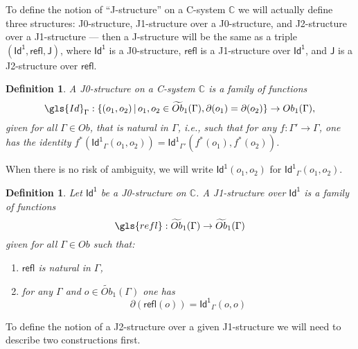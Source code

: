 \documentclass[12pt]{article}
\numberwithin{equation}{section}
\newenvironment{eq}{\begin{equation}}{\end{equation}}
\newtheorem{definition}[proposition]{Definition}
\newcommand{\llabel}[1]{\label{#1}}
\newcommand{\sr}{\rightarrow}
\newcommand{\wt}{\widetilde}
\newcommand{\aCC}{{\mathbb C}}  %
\newcommand{\Id}{\mathsf{Id^1}} %
\newcommand{\refl}{\mathsf{refl}}
\newcommand{\J}{\mathsf{J}}
\begin{document}
To define the notion of ``J-structure'' on a C-system $\aCC$ we will actually define three
structures: J0-structure, J1-structure over a J0-structure, and J2-structure
over a J1-structure --- then a J-structure will be the same as a triple
$(\Id,\refl,\J)$, where $\Id$ is a J0-structure, $\refl$ is a J1-structure over
$\Id$, and $\J$ is a J2-structure over $\refl$.

\begin{definition}
\llabel{2015.03.27.def1}
A J0-structure on a C-system $\aCC$ is a family of functions 
%
$$\gls{Id}_{\Gamma}:\{(o_1,o_2)\,|\,o_1, o_2 \in \wt{Ob}_1(\Gamma), \partial(o_1)=\partial(o_2)\}\sr Ob_1(\Gamma),$$
%
given for all $\Gamma\in Ob$, that is natural in $\Gamma$, i.e., such that for any
$f:\Gamma'\sr \Gamma$, one has the identity
$f^*(\Id_{\Gamma}(o_1,o_2))=\Id_{\Gamma'}(f^*(o_1),f^*(o_2))$.
\end{definition}

When there is no risk of ambiguity, we will write $\Id(o_1,o_2)$ for $\Id_{\Gamma}(o_1,o_2)$.

\begin{definition}
\llabel{2015.03.27.def2}
Let $\Id$ be a J0-structure on $\aCC$. A J1-structure over $\Id$ is a family of
functions
%
$$\gls{refl}:\wt{Ob}_1(\Gamma)\sr \wt{Ob}_1(\Gamma)$$
%
given for all $\Gamma\in Ob$ such that:
%
\begin{enumerate}
\item $\refl$ is natural in $\Gamma$,
\item for any $\Gamma$ and $o\in \wt{Ob}_1(\Gamma)$ one has 
%
\begin{eq}
\llabel{2015.03.27.eq8}
\partial(\refl(o))=\Id_\Gamma(o,o)
\end{eq}%
\end{enumerate}
\end{definition}
%
To define the notion of a J2-structure over a given J1-structure we will need
to describe two constructions first.
\end{document}
